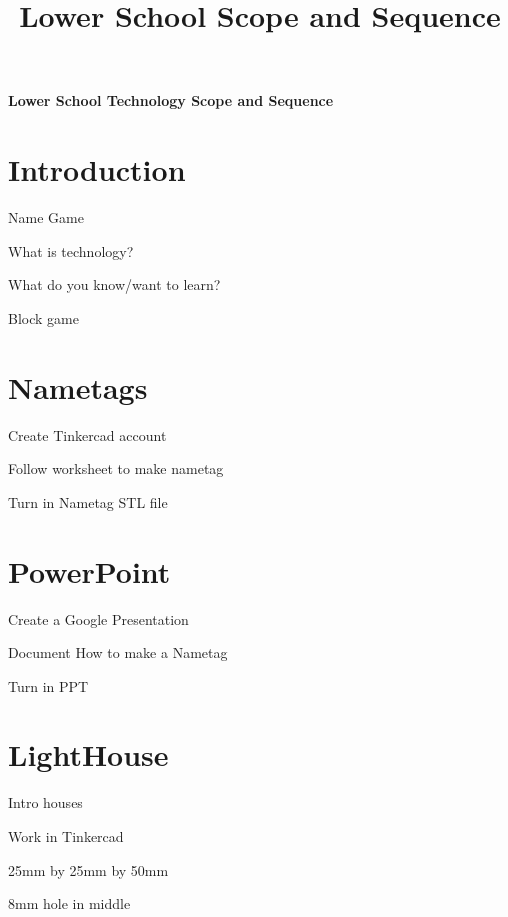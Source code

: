 \documentclass{article}
\def\FithGradeone{Nametags}
\def\FithGradetwo{PowerPoint}
\def\FithGradeThree{LightHouse}
\begin{document}
	\title{Lower School Scope and Sequence}
	\begin{titlepage}
		\begin{center}
			\Huge\textbf{Lower School Technology Scope and Sequence}\\
		\end{center}
	\end{titlepage}
	


	\section{Introduction}
	\begin{todolist}
		\item Name Game
		\item What is technology?
		\item What do you know/want to learn?
		\item Block game
	\end{todolist}
	\section{\FithGradeone}
	\begin{todolist}
		\item Create Tinkercad account
		\item Follow worksheet to make nametag
		\item Turn in Nametag STL file
	\end{todolist}
	\section{\FithGradetwo}
	\begin{todolist}
		\item Create a Google Presentation
		\item Document How to make a Nametag
		\item Turn in PPT
	\end{todolist}
	\section{\FithGradeThree}
	\begin{todolist}
		\item Intro houses
		\item Work in Tinkercad
		\item 25mm by 25mm by 50mm
		\item 8mm hole in middle 
	\end{todolist}
\end{document}
